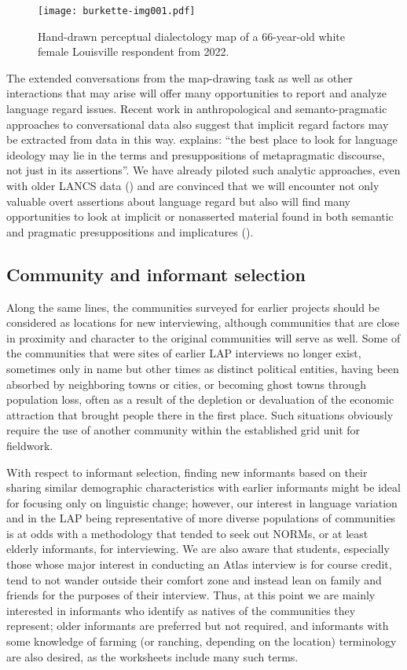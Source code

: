 \documentclass[output=paper]{langscibook}
\begin{document}
\begin{figure}
\texttt{[image: burkette-img001.pdf]}
\caption{\label{fig:burkette:1}Hand-drawn perceptual dialectology map of a 66-year-old white female Louisville respondent from 2022.}
\end{figure}

The extended conversations from the map-drawing task as well as other interactions that may arise will offer many opportunities to report and analyze language regard issues. Recent work in anthropological and semanto-pragmatic approaches to conversational data also suggest that implicit regard factors may be extracted from data in this way. \citet[25]{Irvine2001} explains: ``the best place to look for language ideology may lie in the terms and presuppositions of metapragmatic discourse, not just in its assertions''. We have already piloted such analytic approaches, even with older LANCS data (\citealt{George2022, Passarelli2023}) and are convinced that we will encounter not only valuable overt assertions about language regard but also will find many opportunities to look at implicit or nonasserted material found in both semantic and pragmatic presuppositions and implicatures (\citealt{Preston2019,Preston2023}).

\subsection{Community and informant selection} %
\label{sec:burkette:3.4}
Along the same lines, the communities surveyed for earlier projects should be considered as locations for new interviewing, although communities that are close in proximity and character to the original communities will serve as well. Some of the communities that were sites of earlier LAP interviews no longer exist, sometimes only in name but other times as distinct political entities, having been absorbed by neighboring towns or cities, or becoming ghost towns through population loss, often as a result of the depletion or devaluation of the economic attraction that brought people there in the first place. Such situations obviously require the use of another community within the established grid unit for fieldwork. 

With respect to informant selection, finding new informants based on their sharing similar demographic characteristics with earlier informants might be ideal for focusing only on linguistic change; however, our interest in language variation and in the LAP being representative of more diverse populations of communities is at odds with a methodology that tended to seek out NORMs, or at least elderly informants, for interviewing. We are also aware that students, especially those whose major interest in conducting an Atlas interview is for course credit, tend to not wander outside their comfort zone and instead lean on family and friends for the purposes of their interview. Thus, at this point we are mainly interested in informants who identify as natives of the communities they represent; older informants are preferred but not required, and informants with some knowledge of farming (or ranching, depending on the location) terminology are also desired, as the worksheets include many such terms.   
\end{document}
